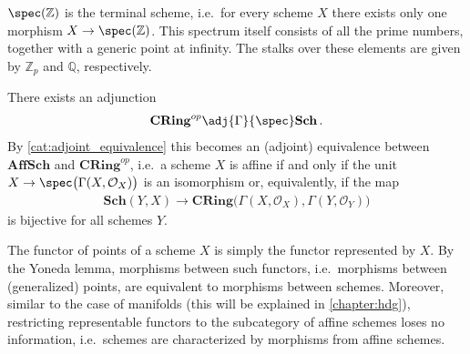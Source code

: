     \begin{property}[Integers]
        $\spec(\mathbb{Z})$ is the terminal scheme, i.e.~for every scheme $X$ there exists only one morphism $X\rightarrow\spec(\mathbb{Z})$. This spectrum itself consists of all the prime numbers, together with a generic point at infinity. The stalks over these elements are given by $\mathbb{Z}_p$ and $\mathbb{Q}$, respectively.
    \end{property}


    \begin{property}
        There exists an adjunction
        \begin{gather}
            \mathbf{CRing}^{op}\adj{\Gamma}{\spec}\mathbf{Sch}\,.
        \end{gather}
        By \cref{cat:adjoint_equivalence} this becomes an (adjoint) equivalence between $\mathbf{AffSch}$ and $\mathbf{CRing}^{op}$, i.e.~a scheme $X$ is affine if and only if the unit $X\rightarrow\spec\big(\Gamma(X,\mathcal{O}_X)\big)$ is an isomorphism or, equivalently, if the map
        \begin{gather}
            \mathbf{Sch}(Y,X)\rightarrow\mathbf{CRing}\bigl(\Gamma(X,\mathcal{O}_X),\Gamma(Y,\mathcal{O}_Y)\bigr)
        \end{gather}
        is bijective for all schemes $Y$.
    \end{property}

    \begin{property}
        The functor of points of a scheme $X$ is simply the functor represented by $X$. By the Yoneda lemma, morphisms between such functors, i.e.~morphisms between (generalized) points, are equivalent to morphisms between schemes. Moreover, similar to the case of manifolds (this will be explained in \cref{chapter:hdg}), restricting representable functors to the subcategory of affine schemes loses no information, i.e.~schemes are characterized by morphisms from affine schemes.
    \end{property}

